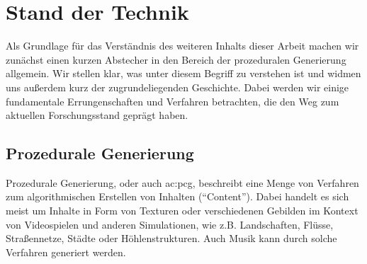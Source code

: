 %
%
%
%
%
%
%
%
%
%
%
%
%

\chapter{Stand der Technik}
Als Grundlage für das Verständnis des weiteren Inhalts dieser Arbeit machen wir zunächst einen kurzen Abstecher in den
Bereich der prozeduralen Generierung allgemein. Wir stellen klar, was unter diesem Begriff zu verstehen ist und widmen
uns außerdem kurz der zugrundeliegenden Geschichte. Dabei werden wir einige fundamentale Errungenschaften und Verfahren
betrachten, die den Weg zum aktuellen Forschungsstand geprägt haben.

\section{Prozedurale Generierung}
Prozedurale Generierung, oder auch \gls{ac:pcg}, beschreibt eine Menge von Verfahren zum algorithmischen Erstellen von
Inhalten (``Content''). Dabei handelt es sich meist um Inhalte in Form von Texturen oder verschiedenen Gebilden im Kontext
von Videospielen und anderen Simulationen, wie z.B. Landschaften, Flüsse, Straßennetze, Städte oder Höhlenstrukturen.
\cite{14_carli_et_al} Auch Musik kann durch solche Verfahren generiert werden. \cite{28_ramanto_maulidevi}

